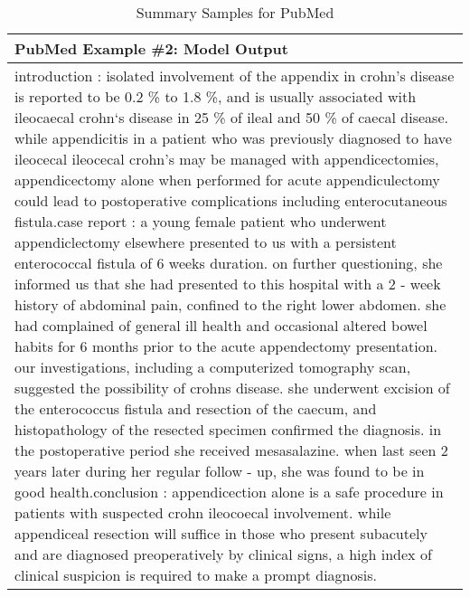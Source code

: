 \begin{table}[!htbp]
\begin{tabular}{p{\linewidth}}
    \\
    \midrule
    \textbf{PubMed Example \#2: Model Output} \\
    \midrule
introduction : isolated involvement of the appendix in crohn's disease is reported to be 0.2 \% to 1.8 \%, and is usually associated with ileocaecal crohn`s disease in 25 \% of ileal and 50 \% of caecal disease. while appendicitis in a patient who was previously diagnosed to have ileocecal ileocecal crohn's may be managed with appendicectomies, appendicectomy alone when performed for acute appendiculectomy could lead to postoperative complications including enterocutaneous fistula.case report : a young female patient who underwent appendiclectomy elsewhere presented to us with a persistent enterococcal fistula of 6 weeks duration. on further questioning, she informed us that she had presented to this hospital with a 2 - week history of abdominal pain, confined to the right lower abdomen. she had complained of general ill health and occasional altered bowel habits for 6 months prior to the acute appendectomy presentation. our investigations, including a computerized tomography scan, suggested the possibility of crohns disease. she underwent excision of the enterococcus fistula and resection of the caecum, and histopathology of the resected specimen confirmed the diagnosis. in the postoperative period she received mesasalazine. when last seen 2 years later during her regular follow - up, she was found to be in good health.conclusion : appendicection alone is a safe procedure in patients with suspected crohn ileocoecal involvement. while appendiceal resection will suffice in those who present subacutely and are diagnosed preoperatively by clinical signs, a high index of clinical suspicion is required to make a prompt diagnosis.    \\
    \bottomrule
    \end{tabular}
    \caption{
    Summary Samples for PubMed
    }
\end{table}

